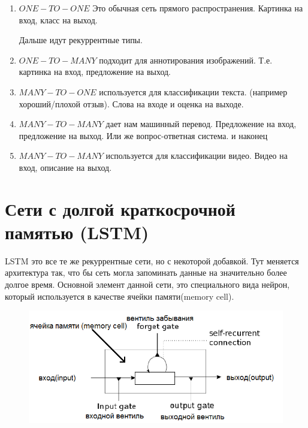 \documentclass[paper=a4, fontsize=11pt]{scrartcl} %
\numberwithin{equation}{section} %
\numberwithin{figure}{section} %
\numberwithin{table}{section} %
\begin{document}
	\begin{enumerate}
	\item $ONE-TO-ONE$ Это обычная сеть прямого распространения. Картинка на вход, класс на выход. 
	
	Дальше идут рекуррентные типы.
	
	\item $ONE-TO-MANY$ подходит для аннотирования изображений. Т.е. картинка на вход, предложение на выход.
	\item $MANY-TO-ONE$ используется для классификации текста. (например хороший/плохой отзыв). Слова на входе и оценка на выходе.
	\item $MANY-TO-MANY$ дает нам машинный перевод. Предложение на вход, предложение на выход. Или же вопрос-ответная система. 
	и наконец
	\item $MANY-TO-MANY$ используется для классификации видео. Видео на вход, описание на выход.

	\end{enumerate}
	
	\section{Сети с долгой краткосрочной памятью (LSTM)}
	LSTM это все те же рекуррентные сети, но с некоторой добавкой. Тут меняется архитектура так, что бы сеть могла запоминать данные на значительно более долгое время. Основной элемент данной сети, это специального вида нейрон, который используется в качестве ячейки памяти(memory cell).
	
	\begin{figure}[h!]
		\centering
		\includegraphics[scale=0.75]{mem_cell}
	\end{figure}
	
\end{document}
